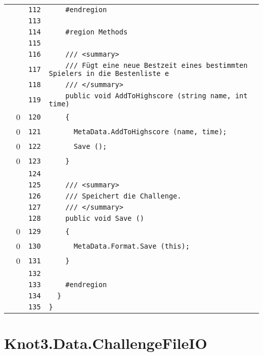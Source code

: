 \documentclass[a4paper,10pt]{article}
\begin{document}
\begin{longtable}[l]{lrrl}
\cellcolor{gray} &  & \verb~112~ & \verb~    #endregion~\\
\cellcolor{gray} &  & \verb~113~ & \verb~~\\
\cellcolor{gray} &  & \verb~114~ & \verb~    #region Methods~\\
\cellcolor{gray} &  & \verb~115~ & \verb~~\\
\cellcolor{gray} &  & \verb~116~ & \verb~    /// <summary>~\\
\cellcolor{gray} &  & \verb~117~ & \verb~    /// Fügt eine neue Bestzeit eines bestimmten Spielers in die Bestenliste e~\\
\cellcolor{gray} &  & \verb~118~ & \verb~    /// </summary>~\\
\cellcolor{gray} &  & \verb~119~ & \verb~    public void AddToHighscore (string name, int time)~\\
\cellcolor{red} & 0 & \verb~120~ & \verb~    {~\\
\cellcolor{red} & 0 & \verb~121~ & \verb~      MetaData.AddToHighscore (name, time);~\\
\cellcolor{red} & 0 & \verb~122~ & \verb~      Save ();~\\
\cellcolor{red} & 0 & \verb~123~ & \verb~    }~\\
\cellcolor{gray} &  & \verb~124~ & \verb~~\\
\cellcolor{gray} &  & \verb~125~ & \verb~    /// <summary>~\\
\cellcolor{gray} &  & \verb~126~ & \verb~    /// Speichert die Challenge.~\\
\cellcolor{gray} &  & \verb~127~ & \verb~    /// </summary>~\\
\cellcolor{gray} &  & \verb~128~ & \verb~    public void Save ()~\\
\cellcolor{red} & 0 & \verb~129~ & \verb~    {~\\
\cellcolor{red} & 0 & \verb~130~ & \verb~      MetaData.Format.Save (this);~\\
\cellcolor{red} & 0 & \verb~131~ & \verb~    }~\\
\cellcolor{gray} &  & \verb~132~ & \verb~~\\
\cellcolor{gray} &  & \verb~133~ & \verb~    #endregion~\\
\cellcolor{gray} &  & \verb~134~ & \verb~  }~\\
\cellcolor{gray} &  & \verb~135~ & \verb~}~\\
\end{longtable}
\newpage
\section{Knot3.Data.ChallengeFileIO}
\end{document}
